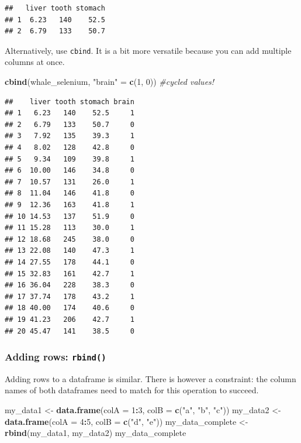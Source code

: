 \documentclass[]{book}
\newenvironment{Shaded}{\begin{snugshade}}{\end{snugshade}}
\newcommand{\CommentTok}[1]{\textcolor[rgb]{0.56,0.35,0.01}{\textit{#1}}}
\newcommand{\DataTypeTok}[1]{\textcolor[rgb]{0.13,0.29,0.53}{#1}}
\newcommand{\DecValTok}[1]{\textcolor[rgb]{0.00,0.00,0.81}{#1}}
\newcommand{\KeywordTok}[1]{\textcolor[rgb]{0.13,0.29,0.53}{\textbf{#1}}}
\newcommand{\NormalTok}[1]{#1}
\newcommand{\OperatorTok}[1]{\textcolor[rgb]{0.81,0.36,0.00}{\textbf{#1}}}
\newcommand{\StringTok}[1]{\textcolor[rgb]{0.31,0.60,0.02}{#1}}
\begin{document}
\begin{verbatim}
##   liver tooth stomach
## 1  6.23   140    52.5
## 2  6.79   133    50.7
\end{verbatim}

Alternatively, use \texttt{cbind}. It is a bit more versatile because you can add multiple columns at once.

\begin{Shaded}
\begin{Highlighting}[]
\KeywordTok{cbind}\NormalTok{(whale_selenium, }\StringTok{"brain"}\NormalTok{ =}\StringTok{ }\KeywordTok{c}\NormalTok{(}\DecValTok{1}\NormalTok{, }\DecValTok{0}\NormalTok{)) }\CommentTok{#cycled values!}
\end{Highlighting}
\end{Shaded}

\begin{verbatim}
##    liver tooth stomach brain
## 1   6.23   140    52.5     1
## 2   6.79   133    50.7     0
## 3   7.92   135    39.3     1
## 4   8.02   128    42.8     0
## 5   9.34   109    39.8     1
## 6  10.00   146    34.8     0
## 7  10.57   131    26.0     1
## 8  11.04   146    41.8     0
## 9  12.36   163    41.8     1
## 10 14.53   137    51.9     0
## 11 15.28   113    30.0     1
## 12 18.68   245    38.0     0
## 13 22.08   140    47.3     1
## 14 27.55   178    44.1     0
## 15 32.83   161    42.7     1
## 16 36.04   228    38.3     0
## 17 37.74   178    43.2     1
## 18 40.00   174    40.6     0
## 19 41.23   206    42.7     1
## 20 45.47   141    38.5     0
\end{verbatim}

\hypertarget{adding-rows-rbind}{%
\subsubsection*{\texorpdfstring{Adding rows: \texttt{rbind()}}{Adding rows: rbind()}}\label{adding-rows-rbind}}

Adding rows to a dataframe is similar. There is however a constraint: the column names of both dataframes need to match for this operation to succeed.

\begin{Shaded}
\begin{Highlighting}[]
\NormalTok{my_data1 <-}\StringTok{ }\KeywordTok{data.frame}\NormalTok{(}\DataTypeTok{colA =} \DecValTok{1}\OperatorTok{:}\DecValTok{3}\NormalTok{, }\DataTypeTok{colB =} \KeywordTok{c}\NormalTok{(}\StringTok{"a"}\NormalTok{, }\StringTok{"b"}\NormalTok{, }\StringTok{"c"}\NormalTok{))}
\NormalTok{my_data2 <-}\StringTok{ }\KeywordTok{data.frame}\NormalTok{(}\DataTypeTok{colA =} \DecValTok{4}\OperatorTok{:}\DecValTok{5}\NormalTok{, }\DataTypeTok{colB =} \KeywordTok{c}\NormalTok{(}\StringTok{"d"}\NormalTok{, }\StringTok{"e"}\NormalTok{))}
\NormalTok{my_data_complete <-}\StringTok{ }\KeywordTok{rbind}\NormalTok{(my_data1, my_data2)}
\NormalTok{my_data_complete}
\end{Highlighting}
\end{Shaded}
\end{document}
